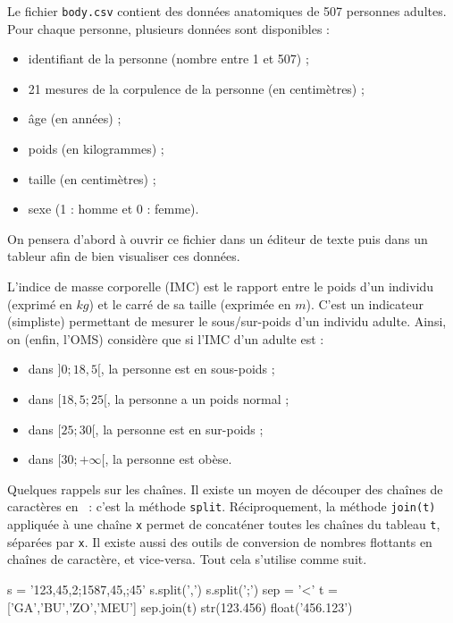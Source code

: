 Le fichier \texttt{body.csv} contient des données anatomiques de 507 personnes adultes. Pour chaque personne, plusieurs données sont disponibles : 
\begin{itemize}
  \item identifiant de la personne (nombre entre 1 et 507) ;
  \item 21 mesures de la corpulence de la personne (en centimètres) ;
  \item âge (en années) ;
  \item poids (en kilogrammes) ; 
  \item taille (en centimètres) ;
  \item sexe (1 : homme et 0 : femme).
\end{itemize}

On pensera d'abord à ouvrir ce fichier dans un éditeur de texte puis dans un tableur afin de bien visualiser ces données. 

L'indice de masse corporelle (IMC) est le rapport entre le poids d'un individu (exprimé en $kg$) et le carré de sa taille (exprimée en $m$). 
C'est un indicateur (simpliste) permettant de mesurer le sous/sur-poids d'un individu adulte. 
Ainsi, on (enfin, l'OMS) considère que si l'IMC d'un adulte est : 


\begin{itemize}
  \item dans $]0;18,5[$, la personne est en sous-poids ;
  \item dans $[18,5;25[$, la personne a un poids normal ; 
  \item dans $[25;30[$, la personne est en sur-poids ; 
  \item dans $[30;+\infty[$, la personne est obèse. 
\end{itemize}

Quelques rappels sur les chaînes. Il existe un moyen de \og découper \fg{} des chaînes de caractères en \python\ : c'est la méthode \texttt{split}. 
Réciproquement, la méthode \texttt{join(t)} appliquée à une chaîne \texttt{x} permet de concaténer toutes les chaînes du tableau \texttt{t}, séparées par \texttt{x}.
Il existe aussi des outils de conversion de nombres flottants en chaînes de caractère, et vice-versa.
Tout cela s'utilise comme suit.

\begin{pyconsole}
s = '123,45,2;1587,45,;45'
s.split(',')
s.split(';')
sep = '<'
t = ['GA','BU','ZO','MEU']
sep.join(t)
str(123.456)
float('456.123')
\end{pyconsole}

